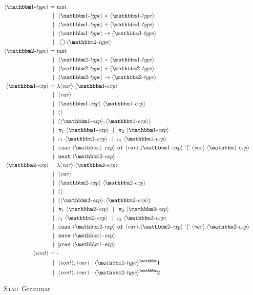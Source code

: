\documentclass[11pt]{article}
\newcommand {\typeo} {\langle\bbone\text{-}\mathit{type}\rangle}
\newcommand {\expro} {\langle\bbone\text{-}\mathit{exp}\rangle}
\newcommand {\typet} {\langle\bbtwo\text{-}\mathit{type}\rangle}
\newcommand {\exprt} {\langle\bbtwo\text{-}\mathit{exp}\rangle}
\newcommand {\var} {\langle\mathit{var}\rangle}
\newcommand {\context} {\langle\mathit{cont}\rangle}
\newcommand {\gbar} {~~|~~}
\newcommand {\fut} {\bigcirc}
\newcommand {\bbone} {\mathbbm 1}
\newcommand {\bbtwo} {\mathbbm 2}
\newcommand {\pause} {{\tt save}}
\newcommand {\next} {{\tt next}}
\newcommand {\prev} {{\tt prev}}
\newcommand {\wstage} {\textsc{Stag}}
\begin{document}
\begin{figure}
\caption{\wstage~Grammar}
\label{fig:gram}
\centering
\begin{align*}
\typeo &= \text{unit} \\
&\gbar \typeo \times \typeo \\
&\gbar \typeo + \typeo \\
&\gbar \typeo \to \typeo \\
&\gbar \fut \typet \\
\typet &= \text{unit} \\
&\gbar \typet \times \typeo \\
&\gbar \typet + \typet \\
&\gbar \typet \to \typet \\
\expro &= \lambda \var.\expro \\
&\gbar \var \\
&\gbar \expro~\expro \\
&\gbar () \\
&\gbar (\expro, \expro) \\
&\gbar \pi_1~\expro \gbar \pi_2~\expro \\
&\gbar \iota_1~\expro \gbar \iota_2~\expro \\
&\gbar {\tt case}~\expro ~{\tt of}~\var.\expro~{\tt `|}\text{'}~\var.\expro \\
&\gbar \next~\exprt \\
\exprt &= \lambda \var.\exprt \\
&\gbar \var \\
&\gbar \exprt~\exprt \\
&\gbar () \\
&\gbar (\exprt, \exprt) \\
&\gbar \pi_1~\exprt \gbar \pi_2~\exprt \\
&\gbar \iota_1~\exprt \gbar \iota_2~\exprt \\
&\gbar {\tt case}~\exprt ~{\tt of}~\var.\exprt~{\tt `|}\text{'}~\var.\exprt \\
&\gbar \pause~\expro \\
&\gbar \prev~\expro \\
\context &= \cdot \\
&\gbar \context, \var : \typeo ^\bbone \\
&\gbar \context, \var : \typet ^\bbtwo
\end{align*}
\end{figure}
\end{document}
